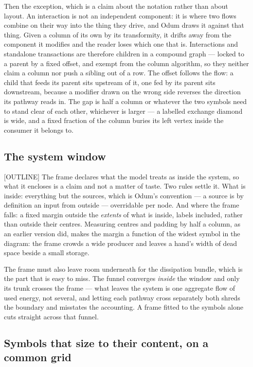 Then the exception, which is a claim about the notation rather than about
layout. An interaction is not an independent component: it is where two flows
combine on their way into the thing they drive, and Odum draws it against that
thing. Given a column of its own by its transformity, it drifts away from the
component it modifies and the reader loses which one that is. Interactions and
standalone transactions are therefore children in a compound graph --- locked to
a parent by a fixed offset, and exempt from the column algorithm, so they
neither claim a column nor push a sibling out of a row. The offset follows the
flow: a child that feeds its parent sits upstream of it, one fed by its parent
sits downstream, because a modifier drawn on the wrong side reverses the
direction its pathway reads in. The gap is half a column or whatever the two
symbols need to stand clear of each other, whichever is larger --- a labelled
exchange diamond is wide, and a fixed fraction of the column buries its left
vertex inside the consumer it belongs to.

\subsection{The system window}

[OUTLINE] The frame declares what the model treats as inside the system, so
what it encloses is a claim and not a matter of taste. Two rules settle it.
What is inside: everything but the sources, which is Odum's convention --- a
source is by definition an input from outside --- overridable per node. And
where the frame falls: a fixed margin outside the \emph{extents} of what is
inside, labels included, rather than outside their centres. Measuring centres
and padding by half a column, as an earlier version did, makes the margin a
function of the widest symbol in the diagram: the frame crowds a wide producer
and leaves a hand's width of dead space beside a small storage.

The frame must also leave room underneath for the dissipation bundle, which is
the part that is easy to miss. The funnel converges \emph{inside} the window and
only its trunk crosses the frame --- what leaves the system is one aggregate
flow of used energy, not several, and letting each pathway cross separately both
shreds the boundary and misstates the accounting. A frame fitted to the symbols
alone cuts straight across that funnel.

\subsection{Symbols that size to their content, on a common grid}

